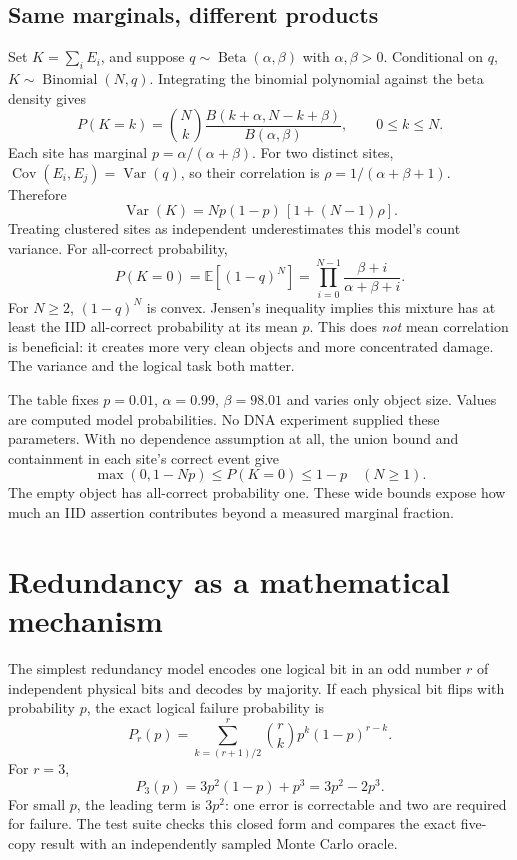 \subsection{Same marginals, different products}
Set $K=\sum_i E_i$, and suppose $q\sim\operatorname{Beta}(\alpha,\beta)$ with
$\alpha,\beta>0$. Conditional on $q$, $K\sim\operatorname{Binomial}(N,q)$.
Integrating the binomial polynomial against the beta density gives
\begin{equation}
P(K=k)={N\choose k}
\frac{B(k+\alpha,N-k+\beta)}{B(\alpha,\beta)},\qquad 0\le k\le N.
\label{dnad23:beta}
\end{equation}
Each site has marginal $p=\alpha/(\alpha+\beta)$. For two distinct sites,
$\operatorname{Cov}(E_i,E_j)=\operatorname{Var}(q)$, so their correlation is
$\rho=1/(\alpha+\beta+1)$. Therefore
\[
\operatorname{Var}(K)=Np(1-p)\,[1+(N-1)\rho].
\]
Treating clustered sites as independent underestimates this model's count variance.
For all-correct probability,
\[
P(K=0)=\mathbb E[(1-q)^N]
=\prod_{i=0}^{N-1}\frac{\beta+i}{\alpha+\beta+i}.
\]
For $N\ge2$, $(1-q)^N$ is convex. Jensen's inequality implies this mixture has
at least the IID all-correct probability at its mean $p$. This does \emph{not}
mean correlation is beneficial: it creates more very clean objects and more
concentrated damage. The variance and the logical task both matter.

\begin{center}\end{center}
The table fixes $p=0.01$, $\alpha=0.99$, $\beta=98.01$ and varies only object
size. Values are computed model probabilities. No DNA experiment supplied these
parameters. With no dependence assumption at all, the union bound and containment
in each site's correct event give
\[
\max(0,1-Np)\le P(K=0)\le1-p \quad (N\ge1).
\]
The empty object has all-correct probability one. These wide bounds expose how
much an IID assertion contributes beyond a measured marginal fraction.

\section{Redundancy as a mathematical mechanism}

The simplest redundancy model encodes one logical bit in an odd number $r$ of
independent physical bits and decodes by majority. If each physical bit flips with
probability $p$, the exact logical failure probability is
\begin{equation}
P_r(p)=\sum_{k=(r+1)/2}^{r}{r\choose k}p^k(1-p)^{r-k}.
\label{dnad23:majority}
\end{equation}
For $r=3$,
\[
P_3(p)=3p^2(1-p)+p^3=3p^2-2p^3.
\]
For small $p$, the leading term is $3p^2$: one error is correctable and two are
required for failure. The test suite checks this closed form and compares the exact
five-copy result with an independently sampled Monte Carlo oracle.

